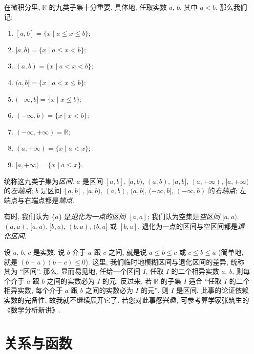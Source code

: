 \begin{definition}
    在微积分里, $\mathbb{R}$ 的九类子集十分重要. 具体地, 任取实数 $a$, $b$, 其中 $a < b$. 那么我们记:
    \begin{enumerate}
        \item $[a, b] = \{ x \mid a \leq x \leq b \}$;
        \item $[a, b) = \{ x \mid a \leq x < b \}$;
        \item $(a, b) = \{ x \mid a < x < b \}$;
        \item $(a, b] = \{ x \mid a < x \leq b \}$;
        \item $(-\infty, b] = \{ x \mid x \leq b \}$;
        \item $(-\infty, b) = \{ x \mid x < b \}$;
        \item $(-\infty, +\infty) = \mathbb{R}$;
        \item $(a, +\infty) = \{ x \mid a < x \}$;
        \item $[a, +\infty) = \{ x \mid a \leq x \}$.
    \end{enumerate}
    统称这九类子集为\emph{区间}. $a$ 是区间 $[a, b]$, $[a, b)$, $(a, b)$, $(a, b]$, $(a, +\infty)$, $[a, +\infty)$ 的\emph{左端点}; $b$ 是区间 $[a, b]$, $[a, b)$, $(a, b)$, $(a, b]$, $(-\infty, b]$, $(-\infty, b)$ 的\emph{右端点}; 左端点与右端点都是\emph{端点}.

    有时, 我们认为 $\{ a \}$ 是\emph{退化为一点的区间} $[a, a]$; 我们认为空集是\emph{空区间} $[a, a)$, $(a, a)$, $[a, a)$, $[b, a)$, $(b, a)$, $(b, a]$ 或 $[b, a]$. 退化为一点的区间与空区间都是\emph{退化区间}.
\end{definition}

\begin{remark}
    设 $a$, $b$, $c$ 是实数. 说 $b$ 介于 $a$ 跟 $c$ 之间, 就是说 $a \leq b \leq c$ 或 $c \leq b \leq a$ (简单地, 就是 $(b - a)(b - c) \leq 0$). 这里, 我们临时地模糊区间与退化区间的差异, 统称其为 ``区间''. 那么, 显而易见地, 任给一个区间 $I$, 任取 $I$ 的二个相异实数 $a$, $b$, 则每个介于 $a$ 跟 $b$ 之间的实数必为 $I$ 的元. 反过来, 若 $\mathbb{R}$ 的子集 $I$ 适合 ``任取 $I$ 的二个相异实数, 每个介于 $a$ 跟 $b$ 之间的实数必为 $I$ 的元'', 则 $I$ 是区间. 此事的论证依赖实数的完备性, 故我就不继续展开它了. 若您对此事感兴趣, 可参考算学家张筑生的《数学分析新讲》.
\end{remark}

\section{关系与函数}

